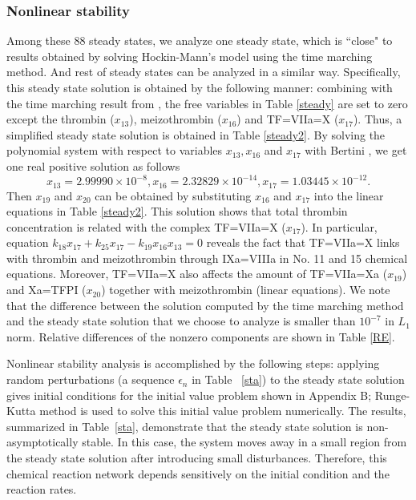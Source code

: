 \subsubsection*{Nonlinear stability}
Among these $88$ steady states, we analyze one steady state, which
is ``close" to results obtained by solving Hockin-Mann's model
\cite{HocJon02} using the time marching method. And rest of steady states can be analyzed in a similar way. Specifically, this
steady state solution is obtained by the following manner: combining
with the time marching result from \cite{HocJon02}, the free
variables in Table \ref{steady} are set to zero except the thrombin
($x_{13}$), meizothrombin ($x_{16}$) and TF=VIIa=X ($x_{17}$). Thus,
a simplified steady state solution is obtained in Table
\ref{steady2}. 
By solving the polynomial system with respect to variables
$x_{13},x_{16}$ and $x_{17}$ with Bertini \cite{Bertini}, we get one
real positive solution as follows
\[
x_{13}=2.99990\times10^{-8},x_{16}=2.32829\times10^{-14},
x_{17}=1.03445\times10^{-12}.\] Then $x_{19}$ and $x_{20}$ can be
obtained by substituting $x_{16}$ and $x_{17}$ into the linear
equations in Table \ref{steady2}. This solution shows that total
thrombin concentration is related with the complex TF=VIIa=X
($x_{17}$). In particular, equation
$k_{18}x_{17}+k_{25}x_{17}-k_{19}x_{16}x_{13}=0$ reveals the fact
that TF=VIIa=X links with thrombin and meizothrombin through
IXa=VIIIa in No. 11 and 15 chemical equations. Moreover, TF=VIIa=X
also affects the amount of TF=VIIa=Xa ($x_{19}$) and Xa=TFPI
($x_{20}$) together with meizothrombin (linear equations).  We note that the difference between the solution computed by the
time marching method and the steady state solution that we choose to
analyze is smaller than  $10^{-7}$ in $L_1$ norm. Relative
differences of the nonzero components are shown in  Table \ref{RE}.

Nonlinear stability analysis is accomplished by the following steps:
applying random perturbations (a sequence $\epsilon_n$ in Table
~\ref{sta}) to the steady state solution gives initial conditions
for the initial value problem shown in Appendix B; Runge-Kutta
method is used to solve this initial value problem numerically. The
results, summarized in Table~\ref{sta}, demonstrate that the steady
state solution is non-asymptotically stable. In this case, the
system moves away in a small region from the steady state solution
after introducing small disturbances. Therefore, this chemical
reaction network depends sensitively on the initial condition and
the reaction rates.

